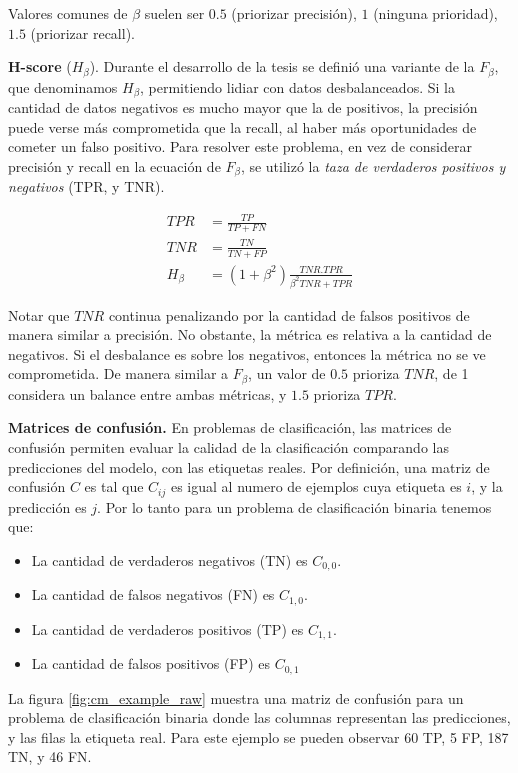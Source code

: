 Valores comunes de $\beta$ suelen ser $0.5$ (priorizar precisión), $1$ (ninguna
prioridad), $1.5$ (priorizar recall).

\textbf{H-score} ($H_{\beta}$). Durante el desarrollo de la tesis se definió una
variante de la $F_{\beta}$, que denominamos $H_{\beta}$, permitiendo lidiar con
datos desbalanceados. Si la cantidad de datos negativos es mucho mayor que la de
positivos, la precisión puede verse más comprometida que la recall, al haber más
oportunidades de cometer un falso positivo. Para resolver este problema, en vez
de considerar precisión y recall en la ecuación de $F_{\beta}$, se utilizó la
\emph{taza de verdaderos positivos y negativos} (TPR, y TNR).

\begin{align}
    TPR &= \frac{TP}{TP + FN} \\
    TNR &= \frac{TN}{TN + FP} \\
    H_{\beta} &= (1 + \beta^2) \frac{TNR . TPR}{\beta^2 TNR + TPR}
\end{align}

Notar que $TNR$ continua penalizando por la cantidad de falsos positivos de
manera similar a precisión. No obstante, la métrica es relativa a la cantidad de
negativos. Si el desbalance es sobre los negativos, entonces la métrica no se ve
comprometida. De manera similar a $F_{\beta}$, un valor de $0.5$ prioriza $TNR$,
de 1 considera un balance entre ambas métricas, y $1.5$ prioriza $TPR$.

\textbf{Matrices de confusión.} En problemas de clasificación, las matrices de
confusión permiten evaluar la calidad de la clasificación comparando las
predicciones del modelo, con las etiquetas reales. Por definición, una matriz de
confusión $C$ es tal que $C_{ij}$ es igual al numero de ejemplos cuya etiqueta
es $i$, y la predicción es $j$. Por lo tanto para un problema de clasificación
binaria tenemos que:

\begin{itemize}
    \item La cantidad de verdaderos negativos (TN) es $C_{0,0}$.
    \item La cantidad de falsos negativos (FN) es $C_{1,0}$.
    \item La cantidad de verdaderos positivos (TP) es $C_{1, 1}$.
    \item La cantidad de falsos positivos (FP) es $C_{0, 1}$
\end{itemize}

La figura \ref{fig:cm_example_raw} muestra una matriz de confusión para un
problema de clasificación binaria donde las columnas representan las
predicciones, y las filas la etiqueta real. Para este ejemplo se pueden observar
60 TP, 5 FP, 187 TN, y 46 FN.

